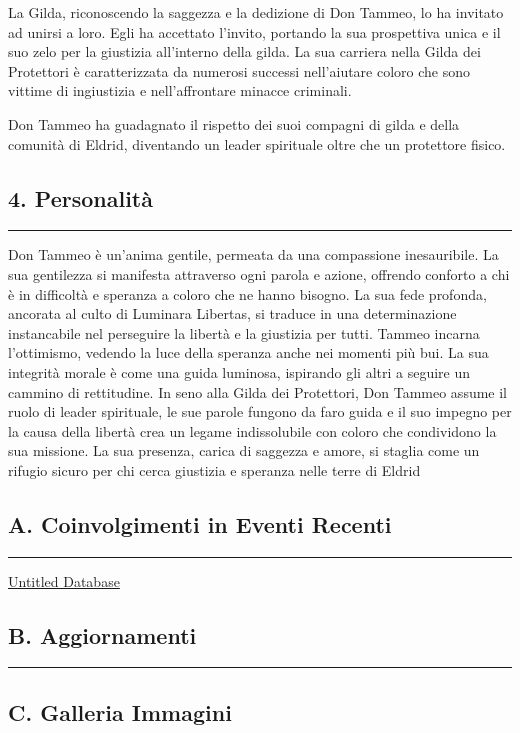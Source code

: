 La Gilda, riconoscendo la saggezza e la dedizione di Don Tammeo, lo ha
invitato ad unirsi a loro. Egli ha accettato l'invito, portando la sua
prospettiva unica e il suo zelo per la giustizia all'interno della
gilda. La sua carriera nella Gilda dei Protettori è caratterizzata da
numerosi successi nell'aiutare coloro che sono vittime di ingiustizia e
nell'affrontare minacce criminali.

Don Tammeo ha guadagnato il rispetto dei suoi compagni di gilda e della
comunità di Eldrid, diventando un leader spirituale oltre che un
protettore fisico.

\subsection{4. Personalità}\label{personalituxe0}

\begin{center}\rule{0.5\linewidth}{0.5pt}\end{center}

Don Tammeo è un'anima gentile, permeata da una compassione inesauribile.
La sua gentilezza si manifesta attraverso ogni parola e azione, offrendo
conforto a chi è in difficoltà e speranza a coloro che ne hanno bisogno.
La sua fede profonda, ancorata al culto di Luminara Libertas, si traduce
in una determinazione instancabile nel perseguire la libertà e la
giustizia per tutti. Tammeo incarna l'ottimismo, vedendo la luce della
speranza anche nei momenti più bui. La sua integrità morale è come una
guida luminosa, ispirando gli altri a seguire un cammino di rettitudine.
In seno alla Gilda dei Protettori, Don Tammeo assume il ruolo di leader
spirituale, le sue parole fungono da faro guida e il suo impegno per la
causa della libertà crea un legame indissolubile con coloro che
condividono la sua missione. La sua presenza, carica di saggezza e
amore, si staglia come un rifugio sicuro per chi cerca giustizia e
speranza nelle terre di Eldrid

\subsection{A. Coinvolgimenti in Eventi
Recenti}\label{a.-coinvolgimenti-in-eventi-recenti}

\begin{center}\rule{0.5\linewidth}{0.5pt}\end{center}

\href{Untitled\%20Database\%204072dbc4c66843f698664cd6770495dc.csv}{Untitled
Database}

\subsection{B. Aggiornamenti}\label{b.-aggiornamenti}

\begin{center}\rule{0.5\linewidth}{0.5pt}\end{center}

\href{Untitled\%20232ee623461a495b99cb6e5142aa9435.csv}{}

\subsection{C. Galleria Immagini}\label{c.-galleria-immagini}

